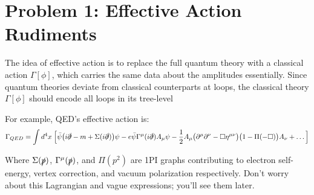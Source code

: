 \documentclass[11pt]{article}
\begin{document}
	
	
	\psetheader
	
	\section*{Problem 1: Effective Action Rudiments}
	
	\begin{problem}
		The idea of effective action is to replace the full quantum theory with a classical action $\Gamma[\phi]$, which carries the same data about the amplitudes essentially. Since quantum theories deviate from classical counterparts at loops, the classical theory $\Gamma[\phi]$ should encode all loops in its tree-level
		
		For example, QED's effective action is:
		\[
		\Gamma_{QED}= \int d^4x \; \Big[
		\bar{\psi} \big(i\slashed{\partial}-m + \Sigma(i\slashed{\partial})\big)\psi 
		-e\bar{\psi} \Gamma^\mu (i\slashed{\partial})A_\mu \psi
		-\frac12 A_\mu \big(
		\partial^\mu\partial^\nu - \Box \eta^{\mu\nu}
		\big)\big(
		1-\Pi(-\Box)
		\big)
		A_\nu + \dots
		\Big]
		\]
		
		\noindent
		Where $\Sigma(\slashed{p})$, $\Gamma^\mu(\slashed{p})$, and $\Pi(p^2)$ are 1PI graphs contributing to electron self-energy, vertex correction, and vacuum polarization respectively. Don't worry about this Lagrangian and vague expressions; you'll see them later.
	\end{problem}
\end{document}
